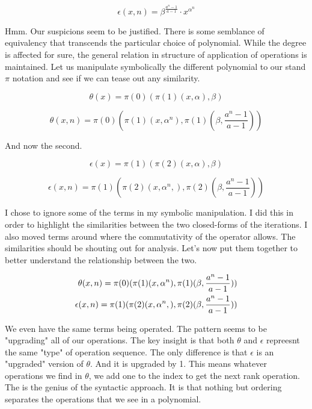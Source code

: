 \begin{equation}
    \epsilon(x,n) = \beta^{\frac{a^n-1}{a-1}} \cdot x^{\alpha^n}
\end{equation}

Hmm. Our suspicions seem to be justified. There is some semblance of
equivalency that transcends the particular choice of polynomial. While the
degree is affected for sure, the general relation in structure of application
of operations is maintained. Let us manipulate symbolically the different
polynomial to our stand $\pi$ notation and see if we can tease out any
similarity.

\begin{equation}
    \theta(x) = \pi(0)(\pi(1)(x, \alpha), \beta)
\end{equation}

\begin{equation}
    \theta(x,n) = \pi(0)(\pi(1)(x, \alpha^n), \pi(1)(\beta, \frac{a^n-1}{a-1}))
\end{equation}

And now the second.

\begin{equation}
    \epsilon(x) = \pi(1)(\pi(2)(x, \alpha), \beta)
\end{equation}

\begin{equation}
    \epsilon(x,n) = \pi(1)(\pi(2)(x, \alpha^n,), \pi(2)(\beta, \frac{a^n-1}{a-1}))
\end{equation}

I chose to ignore some of the terms in my symbolic manipulation. I did this in
order to highlight the similarities between the two closed-forms of the
iterations. I also moved terms around where the commutativity of the operator
allows. The similarities should be shouting out for analysis. Let's now put
them together to better understand the relationship between the two.

\begin{align}
    \theta(x,n) = \pi(0)(\pi(1)(x, \alpha^n), \pi(1)(\beta, \frac{a^n-1}{a-1})) \notag \\
    \epsilon(x,n) = \pi(1)(\pi(2)(x, \alpha^n,), \pi(2)(\beta, \frac{a^n-1}{a-1})) \notag
\end{align}

We even have the same terms being operated. The pattern seems to be "upgrading"
all of our operations. The key insight is that both $\theta$ and $\epsilon$
repreesnt the same "type" of operation sequence. The only difference is that
$\epsilon$ is an "upgraded" version of $\theta$. And it is upgraded by 1. This
means whatever operations we find in $\theta$, we add one to the index to get
the next rank operation. The is the genius of the syntactic approach. It is
that nothing but ordering separates the operations that we see in a polynomial.

